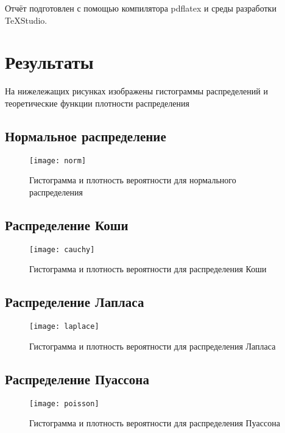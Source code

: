 Отчёт подготовлен с помощью компилятора pdflatex и среды разработки TeXStudio.

\section{Результаты}
На нижележащих рисунках изображены гистограммы распределений и теоретические функции плотности распределения

\subsection{Нормальное распределение}
\begin{figure}[H]
	\begin{center}
		\texttt{[image: norm]}
		\caption{Гистограмма и плотность вероятности для нормального распределения} 
		\label{pic:pic_name}
	\end{center}
\end{figure}

\subsection{Распределение Коши}
\begin{figure}[H]
	\begin{center}
		\texttt{[image: cauchy]}
		\caption{Гистограмма и плотность вероятности для распределения Коши} 
		\label{pic:pic_name} 
	\end{center}
\end{figure}

\subsection{Распределение Лапласа}
\begin{figure}[H]
	\begin{center}
		\texttt{[image: laplace]}
		\caption{Гистограмма и плотность вероятности для распределения Лапласа} 
		\label{pic:pic_name} 
	\end{center}
\end{figure}

\subsection{Распределение Пуассона}
\begin{figure}[H]
	\begin{center}
		\texttt{[image: poisson]}
		\caption{Гистограмма и плотность вероятности для распределения Пуассона} 
		\label{pic:pic_name} 
	\end{center}
\end{figure}

